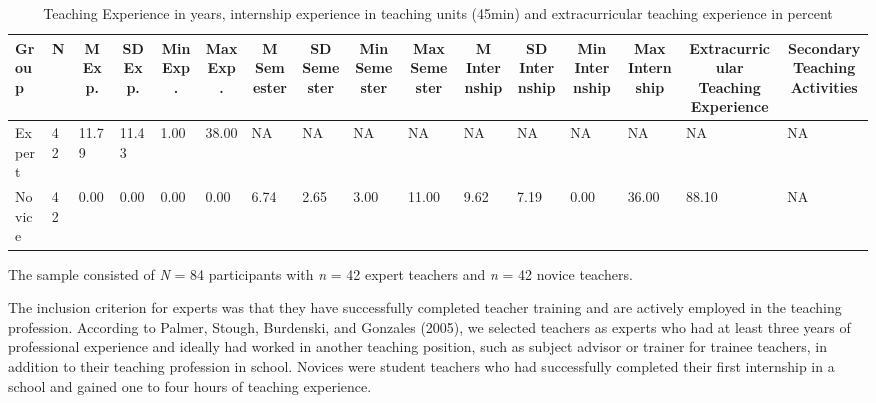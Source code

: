 \documentclass[
  man]{apa6}
\begin{document}
\begin{table}[h]

\begin{center}
\begin{threeparttable}

\caption{\label{tab:demographicstable}Teaching Experience in years, internship experience in teaching units (45min) and extracurricular teaching experience in percent}

\tiny{

\begin{tabular}{llllllllllllllll}
\toprule
Group & \multicolumn{1}{c}{N} & \multicolumn{1}{c}{M Exp.} & \multicolumn{1}{c}{SD Exp.} & \multicolumn{1}{c}{Min Exp.} & \multicolumn{1}{c}{Max Exp.} & \multicolumn{1}{c}{M Semester} & \multicolumn{1}{c}{SD Semester} & \multicolumn{1}{c}{Min Semester} & \multicolumn{1}{c}{Max Semester} & \multicolumn{1}{c}{M Internship} & \multicolumn{1}{c}{SD Internship} & \multicolumn{1}{c}{Min Internship} & \multicolumn{1}{c}{Max Internship} & \multicolumn{1}{c}{Extracurricular Teaching Experience} & \multicolumn{1}{c}{Secondary Teaching Activities}\\
\midrule
Expert & 42 & 11.79 & 11.43 & 1.00 & 38.00 & NA & NA & NA & NA & NA & NA & NA & NA & NA & NA\\
Novice & 42 & 0.00 & 0.00 & 0.00 & 0.00 & 6.74 & 2.65 & 3.00 & 11.00 & 9.62 & 7.19 & 0.00 & 36.00 & 88.10 & NA\\
\bottomrule
\end{tabular}

}

\end{threeparttable}
\end{center}

\end{table}

The sample consisted of \emph{N} = 84 participants with \emph{n} = 42 expert teachers and \emph{n} = 42 novice teachers.

The inclusion criterion for experts was that they have successfully completed teacher training and are actively employed in the teaching profession. According to Palmer, Stough, Burdenski, and Gonzales (2005), we selected teachers as experts who had at least three years of professional experience and ideally had worked in another teaching position, such as subject advisor or trainer for trainee teachers, in addition to their teaching profession in school. Novices were student teachers who had successfully completed their first internship in a school and gained one to four hours of teaching experience.
\end{document}
